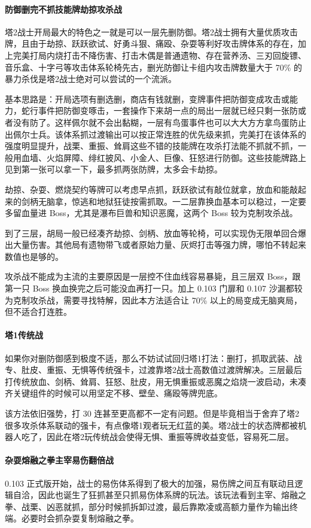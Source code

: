 \documentclass[12pt, a4paper]{article}
\begin{document}
\paragraph{防御删完不抓技能牌劫掠攻杀战}
塔2战士开局最大的特色之一就是可以一层先删防御。塔2战士拥有大量优质攻击牌，且由于劫掠、跃跃欲试、好勇斗狠、痛殴、杂耍等利好攻击牌体系的存在，加上完美打局内烧打击不降伤害、打击木偶是普通遗物、存在营养汤、三刃回旋镖、音乐盒、十字弓等攻击体系轮椅先古，删光防御让卡组内攻击牌数量大于 70\% 的暴力杀伐是塔2战士绝对可以尝试的一个流派。

基本思路是：开局选项有删选删，商店有钱就删，变牌事件把防御变成攻击或能力，蛇行事件把防御变啄击，一套操作下来胡一点的局出一层就已经只剩一张防或者没有防了。这样佩尔就不会出黏糊，一层有鸟蛋事件也可以大大方方拿鸟蛋防止出佩尔士兵。该体系抓过渡输出可以按正常连胜的优先级来抓，完美打在该体系的强度明显提升，战栗、重振、耸肩这些不错的技能牌在攻杀打法能不抓就不抓，一般用血墙、火焰屏障、绯红披风、小金人、巨像、狂怒进行防御。这些技能牌路上见到第一张可以拿一下，最多抓两张防牌，太多会卡劫掠。

劫掠、杂耍、燃烧契约等牌可以考虑早点抓，跃跃欲试有敲位就拿，放血和能敲起来的剑柄无脑拿，惊逃和地狱狂徒按需抓取。一二层靠换血基本可以稳过，一定要多留血量进 Boss，尤其是瀑布巨兽和知识恶魔，这两个 Boss 较为克制攻杀战。

到了三层，胡局一般已经凑齐劫掠、剑柄、放血等轮椅，可以实现伪无限单回合爆出大量伤害。其他局有遗物带飞或者原始力量、灰烬打击等强力牌，哪怕不转起来数值也是够的。

攻杀战不能成为主流的主要原因是一层控不住血线容易暴毙，且三层双 Boss，跟第一只 Boss 换血换完之后可能没血再打一只。加上 0.103 门扉和 0.107 沙漏都较为克制攻杀战，需要寻找特解，因此本方法适合让 70\% 以上的局变成无脑爽局，但不适合打连胜。

\paragraph{塔1传统战}
如果你对删防御感到极度不适，那么不妨试试回归塔1打法：删打，抓取武装、战专、肚皮、重振、无惧等传统强卡，过渡靠塔2战士高数值过渡牌解决。三层最后打传统放血、剑柄、耸肩、狂怒、肚皮，用无惧重振或恶魔之焰烧一波启动，未凑齐关键组件的时候可以用坚定不移、壁垒、痛殴等牌兜底。

该方法依旧强势，打 30 连甚至更高都不一定有问题。但是毕竟相当于舍弃了塔2很多攻杀体系联动的强卡，有点像塔1观者玩无红蓝的美。塔2战士的状态牌都被机器人吃了，因此在塔2玩传统战会使得无惧、重振等牌收益变低，容易死二层。

\paragraph{杂耍熔融之拳主宰易伤翻倍战}
0.103 正式版开始，战士的易伤体系得到了极大的加强，易伤牌之间互有联动且逻辑自洽，因此也诞生了狂抓甚至只抓易伤体系牌的玩法。该玩法看到主宰、熔融之拳、战栗、凶恶就抓，部分时候抓拆卸过渡，最后靠欺凌或高额力量作为输出终端。必要时会抓杂耍复制熔融之拳。
\end{document}
